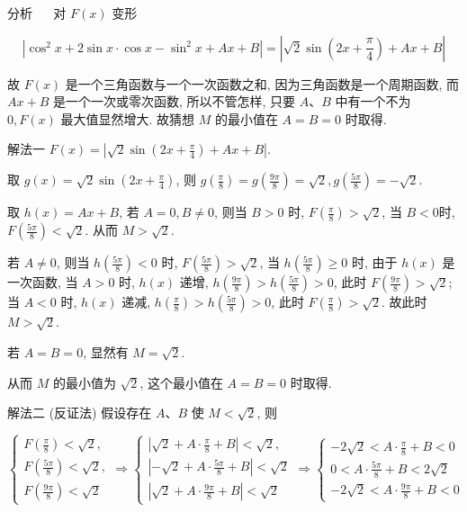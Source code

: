 	分析 $\quad$ 对 $F(x)$ 变形

	$$
		\left|\cos ^{2} x+2 \sin x \cdot \cos x-\sin ^{2} x+A x+B\right|=\left|\sqrt{2} \sin \left(2 x+\frac{\pi}{4}\right)+A x+B\right|
	$$

	故 $F(x)$ 是一个三角函数与一个一次函数之和, 因为三角函数是一个周期函数, 而 $A x+B$ 是一个一次或零次函数, 所以不管怎样, 只要 $A 、 B$ 中有一个不为 $0, F(x)$ 最大值显然增大. 故猜想 $M$ 的最小值在 $A=B=0$ 时取得.

	解法一 $F(x)=\left|\sqrt{2} \sin \left(2 x+\frac{\pi}{4}\right)+A x+B\right|$.

	取 $g(x)=\sqrt{2} \sin \left(2 x+\frac{\pi}{4}\right)$, 则 $g\left(\frac{\pi}{8}\right)=g\left(\frac{9 \pi}{8}\right)=\sqrt{2}, g\left(\frac{5 \pi}{8}\right)=-\sqrt{2}$.

	取 $h(x)=A x+B$, 若 $A=0, B \neq 0$, 则当 $B>0$ 时, $F\left(\frac{\pi}{8}\right)>\sqrt{2}$, 当 $B<0$时, $F\left(\frac{5 \pi}{8}\right)<\sqrt{2}$. 从而 $M>\sqrt{2}$.

	若 $A \neq 0$, 则当 $h\left(\frac{5 \pi}{8}\right)<0$ 时, $F\left(\frac{5 \pi}{8}\right)>\sqrt{2}$, 当 $h\left(\frac{5 \pi}{8}\right) \geqslant 0$ 时, 由于 $h(x)$ 是\\
	一次函数, 当 $A>0$ 时, $h(x)$ 递增, $h\left(\frac{9 \pi}{8}\right)>h\left(\frac{5 \pi}{8}\right)>0$, 此时 $F\left(\frac{9 \pi}{8}\right)>\sqrt{2}$; 当 $A<0$ 时, $h(x)$ 递减, $h\left(\frac{\pi}{8}\right)>h\left(\frac{5 \pi}{8}\right)>0$, 此时 $F\left(\frac{\pi}{8}\right)>\sqrt{2}$. 故此时 $M>\sqrt{2}$.

	若 $A=B=0$, 显然有 $M=\sqrt{2}$.

	从而 $M$ 的最小值为 $\sqrt{2}$, 这个最小值在 $A=B=0$ 时取得.

	解法二 (反证法) 假设存在 $A 、 B$ 使 $M<\sqrt{2}$, 则

	\[
		\left\{\begin{array} { l }
			{ F ( \frac { \pi } { 8 } ) < \sqrt { 2 } , }  \tag{1} \\
			{ F ( \frac { 5 \pi } { 8 } ) < \sqrt { 2 } , }        \\
			{ F ( \frac { 9 \pi } { 8 } ) < \sqrt { 2 } }
		\end{array} \Rightarrow \left\{\begin{array} { l }
			{ | \sqrt { 2 } + A \cdot \frac { \pi } { 8 } + B | < \sqrt { 2 } , }   \\
			{ | - \sqrt { 2 } + A \cdot \frac { 5 \pi } { 8 } + B | < \sqrt { 2 } } \\
			{ | \sqrt { 2 } + A \cdot \frac { 9 \pi } { 8 } + B | < \sqrt { 2 } }
		\end{array} \Rightarrow \left\{\begin{array}{l}
			-2 \sqrt{2}<A \cdot \frac{\pi}{8}+B<0  \\
			0<A \cdot \frac{5 \pi}{8}+B<2 \sqrt{2} \\
			-2 \sqrt{2}<A \cdot \frac{9 \pi}{8}+B<0
		\end{array}\right.\right.\right.
	\]

